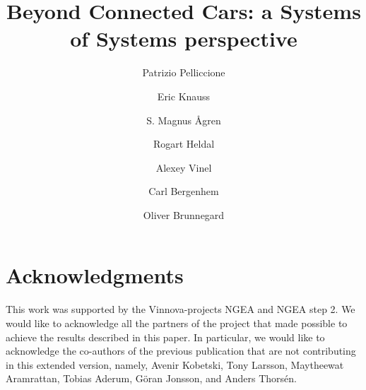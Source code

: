 \documentclass[preprint]{elsarticle}
\begin{document}
\begin{frontmatter}

\title{Beyond Connected Cars: a Systems of Systems perspective
}

\author[uda,gu]{Patrizio Pelliccione}
\author[gu]{Eric Knauss}
\author[gu]{S. Magnus Ågren}
\author[ber]{Rogart Heldal}
\author[hh,ber]{Alexey Vinel}
\author[qua]{Carl Bergenhem}
\author[veo]{Oliver Brunnegard}

\address[uda]{Universit\`a degli Studi dell'Aquila,
  Dipartimento di Informatica,\\
  {\tt patrizio.pelliccione@univaq.it}}
\address[gu]{Chalmers $\mid$ Gothenburg University
  Gothenburg, Sweden\\
  {\tt \{erik.knauss,patrizio.pelliccione\}@gu.se}\\{\tt magnus.agren@chalmers.se}}
\address[ber]{Western Norway University of Applied Sciences,
Bergen, Norway\\
  {\tt \{rogardt.heldal,alexey.vinel\}@hvl.no} } 
\address[hh]{Halmstad University,
Halmstad, Sweden\\
  {\tt  alexey.vinel@hh.se} }   
\address[qua]{Qamcom AB, Gothenburg, Sweden\\
  {\tt carl.bergenhem@qamcom.se}}
\address[veo]{Veoneer AB, Sweden\\
{\tt oliver.brunnegard@veoneer.com}  
}  


\end{frontmatter}












\section*{Acknowledgments}
This work was supported by the Vinnova-projects NGEA and NGEA step 2. We would like to acknowledge all the partners of the project that made possible to achieve the results described in this paper. In particular, we would like to acknowledge the co-authors of the previous publication that are not contributing in this extended version, namely, Avenir Kobetski, Tony Larsson, Maytheewat Aramrattan,
Tobias Aderum, G\"oran Jonsson, and  Anders Thors\'en.



\end{document}
